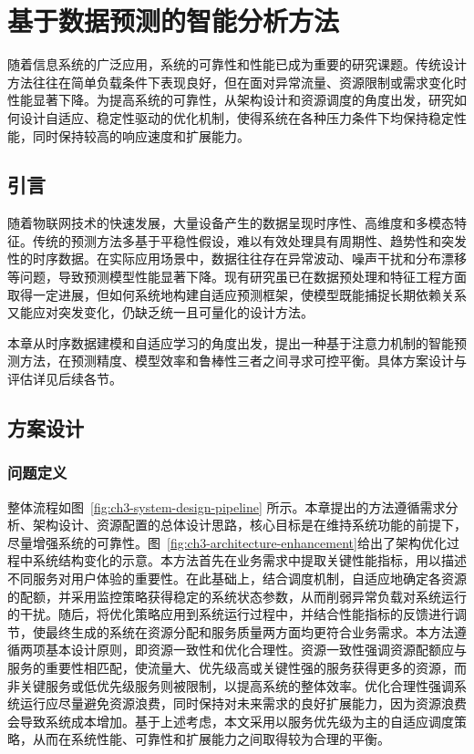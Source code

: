 
\chapter{基于数据预测的智能分析方法}\label{ch:data-prediction}

随着信息系统的广泛应用，系统的可靠性和性能已成为重要的研究课题。传统设计方法往往在简单负载条件下表现良好，但在面对异常流量、资源限制或需求变化时性能显著下降。为提高系统的可靠性，从架构设计和资源调度的角度出发，研究如何设计自适应、稳定性驱动的优化机制，使得系统在各种压力条件下均保持稳定性能，同时保持较高的响应速度和扩展能力。

\section{引言}\label{ux5f15ux8a00}

随着物联网技术的快速发展，大量设备产生的数据呈现时序性、高维度和多模态特征。传统的预测方法多基于平稳性假设，难以有效处理具有周期性、趋势性和突发性的时序数据。在实际应用场景中，数据往往存在异常波动、噪声干扰和分布漂移等问题，导致预测模型性能显著下降。现有研究虽已在数据预处理和特征工程方面取得一定进展，但如何系统地构建自适应预测框架，使模型既能捕捉长期依赖关系又能应对突发变化，仍缺乏统一且可量化的设计方法。

本章从时序数据建模和自适应学习的角度出发，提出一种基于注意力机制的智能预测方法，在预测精度、模型效率和鲁棒性三者之间寻求可控平衡。具体方案设计与评估详见后续各节。

\section{方案设计}\label{ux65b9ux6848ux8bbeux8ba1}

\subsection{问题定义}\label{ux95eeux9898ux5b9aux4e49}

整体流程如图~\ref{fig:ch3-system-design-pipeline} 所示。本章提出的方法遵循需求分析、架构设计、资源配置的总体设计思路，核心目标是在维持系统功能的前提下，尽量增强系统的可靠性。图~\ref{fig:ch3-architecture-enhancement}给出了架构优化过程中系统结构变化的示意。本方法首先在业务需求中提取关键性能指标，用以描述不同服务对用户体验的重要性。在此基础上，结合调度机制，自适应地确定各资源的配额，并采用监控策略获得稳定的系统状态参数，从而削弱异常负载对系统运行的干扰。随后，将优化策略应用到系统运行过程中，并结合性能指标的反馈进行调节，使最终生成的系统在资源分配和服务质量两方面均更符合业务需求。本方法遵循两项基本设计原则，即资源一致性和优化合理性。资源一致性强调资源配额应与服务的重要性相匹配，使流量大、优先级高或关键性强的服务获得更多的资源，而非关键服务或低优先级服务则被限制，以提高系统的整体效率。优化合理性强调系统运行应尽量避免资源浪费，同时保持对未来需求的良好扩展能力，因为资源浪费会导致系统成本增加。基于上述考虑，本文采用以服务优先级为主的自适应调度策略，从而在系统性能、可靠性和扩展能力之间取得较为合理的平衡。

